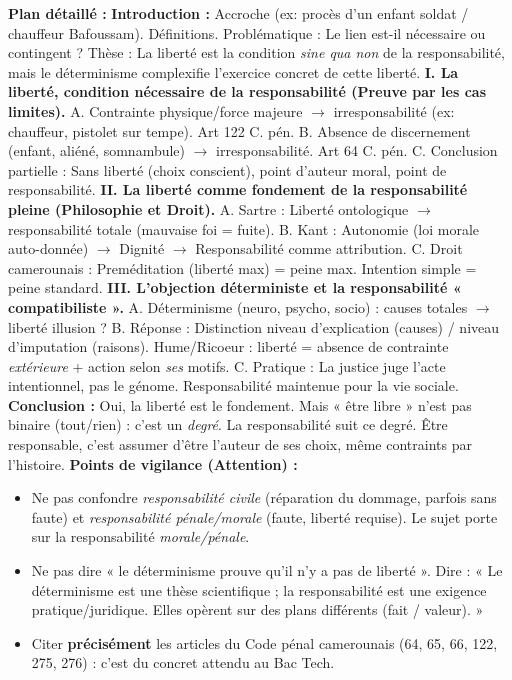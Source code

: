 \documentclass[11pt]{article}
\begin{document}
\begin{exoresolu}
\textbf{Plan détaillé :}
\textbf{Introduction :} Accroche (ex: procès d'un enfant soldat / chauffeur Bafoussam). Définitions. Problématique : Le lien est-il nécessaire ou contingent ? Thèse : La liberté est la condition \textit{sine qua non} de la responsabilité, mais le déterminisme complexifie l'exercice concret de cette liberté.
\textbf{I. La liberté, condition nécessaire de la responsabilité (Preuve par les cas limites).}
    A. Contrainte physique/force majeure $\rightarrow$ irresponsabilité (ex: chauffeur, pistolet sur tempe). Art 122 C. pén.
    B. Absence de discernement (enfant, aliéné, somnambule) $\rightarrow$ irresponsabilité. Art 64 C. pén.
    C. Conclusion partielle : Sans liberté (choix conscient), point d'auteur moral, point de responsabilité.
\textbf{II. La liberté comme fondement de la responsabilité pleine (Philosophie et Droit).}
    A. Sartre : Liberté ontologique $\rightarrow$ responsabilité totale (mauvaise foi = fuite).
    B. Kant : Autonomie (loi morale auto-donnée) $\rightarrow$ Dignité $\rightarrow$ Responsabilité comme attribution.
    C. Droit camerounais : Preméditation (liberté max) = peine max. Intention simple = peine standard.
\textbf{III. L'objection déterministe et la responsabilité « compatibiliste ».}
    A. Déterminisme (neuro, psycho, socio) : causes totales $\rightarrow$ liberté illusion ?
    B. Réponse : Distinction niveau d'explication (causes) / niveau d'imputation (raisons). Hume/Ricoeur : liberté = absence de contrainte \emph{extérieure} + action selon \emph{ses} motifs.
    C. Pratique : La justice juge l'acte intentionnel, pas le génome. Responsabilité maintenue pour la vie sociale.
\textbf{Conclusion :} Oui, la liberté est le fondement. Mais « être libre » n'est pas binaire (tout/rien) : c'est un \emph{degré}. La responsabilité suit ce degré. Être responsable, c'est assumer d'être l'auteur de ses choix, même contraints par l'histoire.
\tcblower
\textbf{Points de vigilance (Attention) :}
\begin{itemize}
    \item Ne pas confondre \emph{responsabilité civile} (réparation du dommage, parfois sans faute) et \emph{responsabilité pénale/morale} (faute, liberté requise). Le sujet porte sur la responsabilité \emph{morale/pénale}.
    \item Ne pas dire « le déterminisme prouve qu'il n'y a pas de liberté ». Dire : « Le déterminisme est une thèse scientifique ; la responsabilité est une exigence pratique/juridique. Elles opèrent sur des plans différents (fait / valeur). »
    \item Citer \textbf{précisément} les articles du Code pénal camerounais (64, 65, 66, 122, 275, 276) : c'est du concret attendu au Bac Tech.
\end{itemize}
\end{exoresolu}
\end{document}
